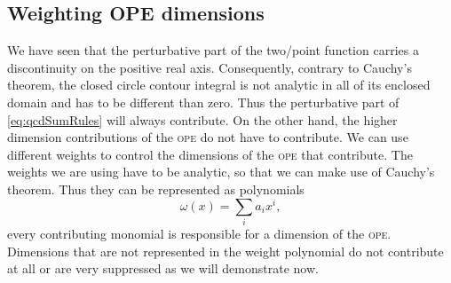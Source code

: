 \documentclass[../../index.tex]{subfiles}
\begin{document}
\subsection{Weighting OPE dimensions}
We have seen that the perturbative part of the two\-/point function carries a
discontinuity on the positive real axis. Consequently, contrary to Cauchy's
theorem, the closed circle contour integral is not analytic in all of its
enclosed domain and has to be different than zero. Thus the perturbative part of
\cref{eq:qcdSumRules} will always contribute. On the other hand, the higher
dimension contributions of the \textsc{ope} do not have to contribute. We can
use different weights to control the dimensions of the \textsc{ope} that
contribute. The weights we are using have to be analytic, so that we can make
use of Cauchy's theorem. Thus they can be represented as polynomials
\begin{equation}
  \omega(x) = \sum_i a_i x^i,
\end{equation}
every contributing monomial is responsible for a dimension of the \textsc{ope}.
Dimensions that are not represented in the weight polynomial do not contribute
at all or are very suppressed as we will demonstrate now.
\end{document}
